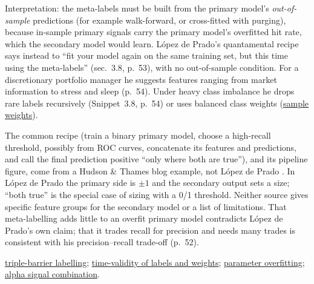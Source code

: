 \begin{qfmethod}
 Interpretation: the meta-labels must be built from the primary model's \emph{out-of-sample} predictions (for example walk-forward, or cross-fitted with purging), because in-sample primary signals carry the primary model's overfitted hit rate, which the secondary model would learn. López de Prado's quantamental recipe says instead to ``fit your model again on the same training set, but this time using the meta-labels'' (sec.~3.8, p.~53), with no out-of-sample condition. For a discretionary portfolio manager he suggests features ranging from market information to stress and sleep (p.~54). Under heavy class imbalance he drops rare labels recursively (Snippet~3.8, p.~54) or uses balanced class weights (\hyperref[meth:sample-weights-attribution-decay]{sample weights}).

 The common recipe (train a binary primary model, choose a high-recall threshold, possibly from ROC curves, concatenate its features and predictions, and call the final prediction positive ``only where both are true''), and its pipeline figure, come from a Hudson \& Thames blog example, not López de Prado \citep[``Model Architecture'' section]{ht-meta-labeling-toy}. In López de Prado the primary side is $\pm1$ and the secondary output sets a size; ``both true'' is the special case of sizing with a 0/1 threshold. Neither source gives specific feature groups for the secondary model or a list of limitations. That meta-labelling adds little to an overfit primary model contradicts López de Prado's own claim; that it trades recall for precision and needs many trades is consistent with his precision--recall trade-off (p.~52).

 \hyperref[meth:triple-barrier-labelling]{triple-barrier labelling}; \hyperref[pit:label-weight-leakage]{time-validity of labels and weights}; \hyperref[pit:parameter-overfitting]{parameter overfitting}; \hyperref[meth:alpha-signal-combination]{alpha signal combination}.

\end{qfmethod}

